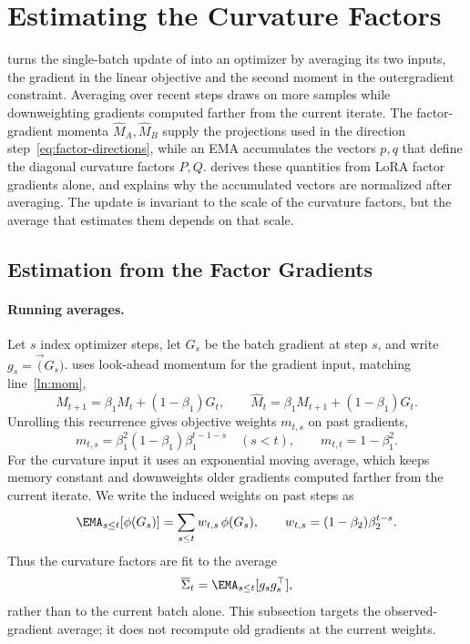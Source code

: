 
\section{Estimating the Curvature Factors}
\label{app:matnormal-w1}
 turns the single-batch update of
 into an optimizer by averaging its two inputs,
the gradient in the linear objective and the second moment in the
outergradient constraint. Averaging over recent steps draws on more samples
while downweighting gradients computed farther from the current iterate. The factor-gradient
momenta $\widehat M_A,\widehat M_B$ supply
the projections used in the direction step~\eqref{eq:factor-directions},
while an EMA accumulates the vectors $p,q$ that define the diagonal
curvature factors $P,Q$.  derives these
quantities from LoRA factor gradients alone, and
 explains why the accumulated vectors are
normalized after averaging. The update is invariant to the scale of the
curvature factors, but the average that estimates them depends on that scale.

\subsection{Estimation from the Factor Gradients}
\label{sec:weighted-estimation-w1}

\paragraph{Running averages.} Let $s$ index optimizer steps, let $G_s$ be
the batch gradient at step $s$, and write $g_s=\vec(G_s)$.
 uses look-ahead momentum for the gradient input, matching
line~\ref{ln:mom},
\[
  M_{t+1}=\beta_1M_t+(1-\beta_1)G_t,
  \qquad
  \widehat M_t=\beta_1M_{t+1}+(1-\beta_1)G_t.
\]
Unrolling this recurrence gives objective weights $m_{t,s}$ on past
gradients,
\[
  m_{t,s}=\beta_1^2(1-\beta_1)\beta_1^{t-1-s}
  \quad(s<t),
  \qquad
  m_{t,t}=1-\beta_1^2 .
\]
For the curvature input it uses an exponential moving average, which keeps
memory constant and downweights older gradients computed farther from the
current iterate. We write the induced weights on past steps as
\[
  \EMA_{s \leq t}[\phi(G_s)]=\sum_{s\le t}w_{t,s}\,\phi(G_s),
  \qquad
  w_{t,s}=(1-\beta_2)\beta_2^{t-s}.
\]
Thus the curvature factors are fit to the average
\[
  \overline{\Sigma}_t=\EMA_{s\leq t}[g_sg_s^\top],
\]
rather than to the current batch alone. This subsection targets the
observed-gradient average; it does not recompute old gradients at the current
weights.

